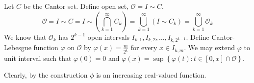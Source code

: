 \begin{definition}
	Let $C$ be the Cantor set.
	Define open set, $\mathcal{O} = I \sim C$.
	$$\mathcal{O} = I \sim C = I \sim \left( \bigcap_{k=1}^\infty C_k \right) = \bigcup_{k=1}^\infty \left( I \sim C_k \right) = \bigcup_{k=1}^\infty \mathcal{O}_k$$
	We know that $\mathcal{O}_k$ has $2^{k-1}$ open intervals $I_{k,1}, I_{k,2},\dots,I_{k,2^{k-1}}$.
	Define Cantor-Lebesgue function $\varphi$ on $\mathcal{O}$ by $\varphi(x) = \frac{m}{2^k}$ for every $x \in I_{k,m}$.
	We may extend $\varphi$ to unit interval such that $\varphi(0) = 0$ and $\varphi(x) = \sup \left\{ \varphi(t) : t \in [0,x] \cap \mathcal{O} \right\}$.
\end{definition}

Clearly, by the construction $\phi$ is an increasing real-valued function.

